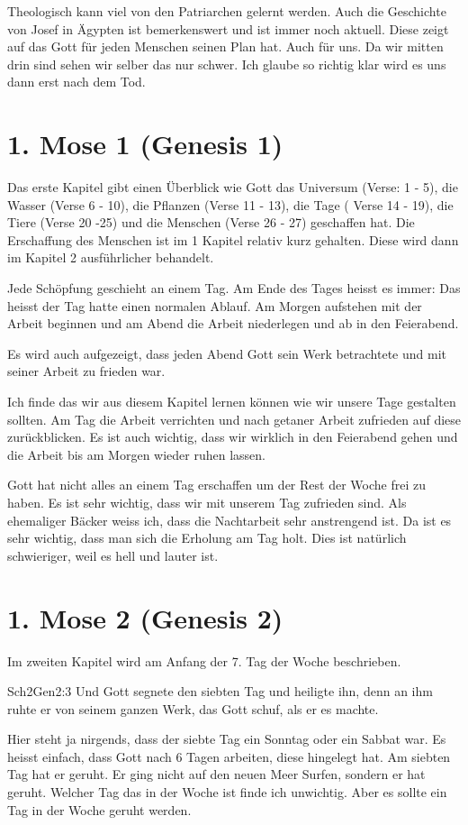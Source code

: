 Theologisch kann viel von den Patriarchen gelernt werden. Auch die Geschichte von Josef in Ägypten ist bemerkenswert und ist immer noch aktuell. Diese zeigt auf das Gott für jeden Menschen seinen Plan hat. Auch für uns. Da wir mitten drin sind sehen wir selber das nur schwer. Ich glaube so richtig klar wird es uns dann erst nach dem Tod.
\section{1. Mose 1 (Genesis 1)}
Das erste Kapitel gibt einen Überblick wie Gott das Universum (Verse: 1 - 5), die Wasser (Verse 6 - 10), die Pflanzen (Verse 11 - 13), die Tage ( Verse 14 - 19), die Tiere (Verse 20 -25) und die Menschen (Verse 26 - 27) geschaffen hat. Die Erschaffung des Menschen ist im 1 Kapitel relativ kurz gehalten. Diese wird dann im Kapitel 2 ausführlicher behandelt.

Jede Schöpfung geschieht an einem Tag. Am Ende des Tages heisst es immer:  Das heisst der Tag hatte einen normalen Ablauf. Am Morgen aufstehen mit der Arbeit beginnen und am Abend die Arbeit niederlegen und ab in den Feierabend.

Es wird auch aufgezeigt, dass jeden Abend Gott sein Werk betrachtete und mit seiner Arbeit zu frieden war.

Ich finde das wir aus diesem Kapitel lernen können wie wir unsere Tage gestalten sollten. Am Tag die Arbeit verrichten und nach getaner Arbeit zufrieden auf diese zurückblicken. Es ist auch wichtig, dass wir wirklich in den Feierabend gehen und die Arbeit bis am Morgen wieder ruhen lassen.

Gott hat nicht alles an einem Tag erschaffen um der Rest der Woche frei zu haben. Es ist sehr wichtig, dass wir mit unserem Tag zufrieden sind. Als ehemaliger Bäcker weiss ich, dass die Nachtarbeit sehr anstrengend ist. Da ist es sehr wichtig, dass man sich die Erholung am Tag holt. Dies ist natürlich schwieriger, weil es hell und lauter ist.
\section{1. Mose 2 (Genesis 2)}
Im zweiten Kapitel wird am Anfang der 7. Tag der Woche beschrieben. 
\begin{bibeltext}{Sch2}{Gen}{2:3}
    Und Gott segnete den siebten Tag und heiligte ihn, denn an ihm ruhte er von seinem ganzen Werk, das Gott schuf, als er es machte.
\end{bibeltext}
Hier steht ja nirgends, dass der siebte Tag ein Sonntag oder ein Sabbat war. Es heisst einfach, dass Gott nach 6 Tagen arbeiten, diese hingelegt hat. Am siebten Tag hat er geruht. Er ging nicht auf den neuen Meer Surfen, sondern er hat geruht. Welcher Tag das in der Woche ist finde ich unwichtig. Aber es sollte ein Tag in der Woche geruht werden.

